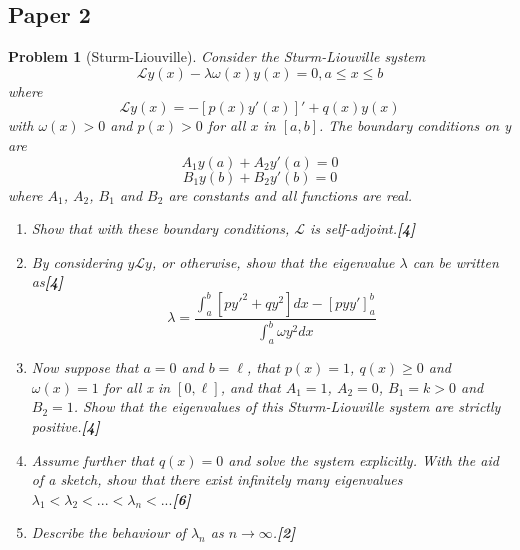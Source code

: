 \documentclass[a4paper]{article}
\theoremstyle{new}
\newtheorem{qns}{Problem}[section]
\begin{document}
\subsection{Paper 2}
\begin{qns}[Sturm-Liouville]
Consider the Sturm-Liouville system
$$\mathcal{L}y(x)-\lambda\omega(x)y(x)=0,a\leq x\leq b$$
where
$$\mathcal{L}y(x) = −[p(x)y'(x)]' + q(x)y(x)$$
with $\omega(x) > 0$ and $p(x) > 0$ for all $x$ in $[a, b]$. The boundary conditions on y are
$$A_1 y(a) + A_2 y'(a) = 0$$
$$B_1 y(b) + B_2 y'(b) = 0$$
where $A_1$, $A_2$, $B_1$ and $B_2$ are constants and all functions are real.
\begin{enumerate}[label=(\alph*)]
\item Show that with these boundary conditions, $\mathcal{L}$ is self-adjoint.\hfill\textbf{[4]}
\item By considering $y\mathcal{L}y$, or otherwise, show that the eigenvalue $\lambda$ can be written as\hfill\textbf{[4]}
$$\lambda=\frac{\int_a^b[py'^2+qy^2]dx-[pyy']_a^b}{\int_a^b\omega y^2dx}$$
\item Now suppose that $a = 0$ and $b =\ell$, that $p(x) = 1$, $q(x)\geq 0$ and $\omega(x) = 1$ for all x in $[0,\ell]$, and that $A_1 = 1$, $A_2 = 0$, $B_1 = k > 0$ and $B_2 = 1$. Show that the eigenvalues of this Sturm-Liouville system are strictly positive.\hfill\textbf{[4]}
\item Assume further that $q(x) = 0$ and solve the system explicitly. With the aid of a sketch, show that there exist infinitely many eigenvalues $\lambda_1<\lambda_2<...<\lambda_n<...$\hfill\textbf{[6]}
\item Describe the behaviour of $\lambda_n$ as $n\rightarrow\infty$.\hfill\textbf{[2]}
\end{enumerate}
\end{qns}
\end{document}
